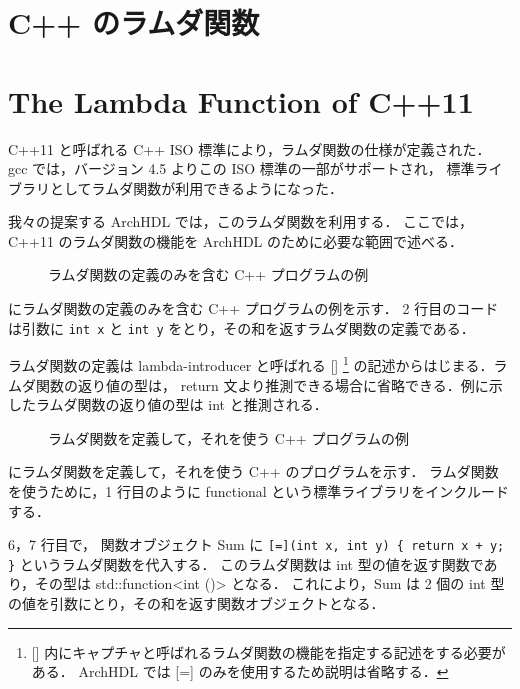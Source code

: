 \section{C++ のラムダ関数}
\fi
\section{The Lambda Function of C++11} \label{s:lambda}


C++11 と呼ばれる C++ ISO 標準により，ラムダ関数の仕様が定義された． gcc
では，バージョン 4.5 よりこの ISO 標準の一部がサポートされ，
標準ライブラリとしてラムダ関数が利用できるようになった．

我々の提案する ArchHDL では，このラムダ関数を利用する． ここでは，C++11
のラムダ関数の機能を ArchHDL のために必要な範囲で述べる．

\begin{figure}[t]
 
 \caption{ラムダ関数の定義のみを含む C++ プログラムの例}
 \label{src:def_lambda}
\end{figure}

 にラムダ関数の定義のみを含む C++
プログラムの例を示す． 2 行目のコードは引数に \verb`int x` と
\verb`int y` をとり，その和を返すラムダ関数の定義である．

ラムダ関数の定義は lambda-introducer と呼ばれる {[}{]} \footnote{
[] 内にキャプチャと呼ばれるラムダ関数の機能を指定する記述をする必要がある．
ArchHDL では [=] のみを使用するため説明は省略する．
} の記述からはじまる．ラムダ関数の返り値の型は， return
文より推測できる場合に省略できる．例に示したラムダ関数の返り値の型は int
と推測される．

\begin{figure}[t]
 
 \caption{ラムダ関数を定義して，それを使う C++ プログラムの例}
 \label{src:ex_lambda}
\end{figure}

 にラムダ関数を定義して，それを使う C++
のプログラムを示す． ラムダ関数を使うために，1 行目のように functional
という標準ライブラリをインクルードする．

6，7 行目で， 関数オブジェクト Sum に
\verb`[=](int x, int y) { return x + y; }` というラムダ関数を代入する．
このラムダ関数は int 型の値を返す関数であり，その型は
std::function\textless{}int ()\textgreater{} となる． これにより，Sum は
2 個の int 型の値を引数にとり，その和を返す関数オブジェクトとなる．


